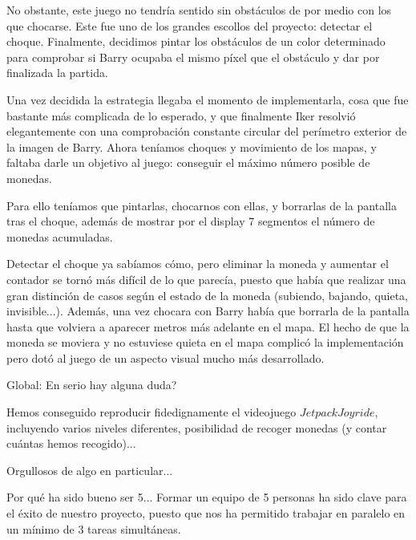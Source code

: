 \documentclass[11pt, a4paper, spanish, openright, twoside]{book}
\begin{document}
No obstante, este juego no tendría sentido sin obstáculos de por medio con los que chocarse.
Este fue uno de los grandes escollos del proyecto: detectar el choque.
Finalmente, decidimos pintar los obstáculos de un color determinado para comprobar si Barry ocupaba el mismo píxel que el obstáculo y dar por finalizada la partida.

Una vez decidida la estrategia llegaba el momento de implementarla, cosa que fue bastante más complicada de lo esperado, y que finalmente Iker resolvió elegantemente con una comprobación constante circular del perímetro exterior de la imagen de Barry.
Ahora teníamos choques y movimiento de los mapas, y faltaba darle un objetivo al juego: conseguir el máximo número posible de monedas.

Para ello teníamos que pintarlas, chocarnos con ellas, y borrarlas de la pantalla tras el choque, además de mostrar por el display 7 segmentos el número de monedas acumuladas.

Detectar el choque ya sabíamos cómo, pero eliminar la moneda y aumentar el contador se tornó más difícil de lo que parecía, puesto que había que realizar una gran distinción de casos según el estado de la moneda (subiendo, bajando, quieta, invisible...). Además, una vez chocara con Barry había que borrarla de la pantalla hasta que volviera a aparecer metros más adelante en el mapa. El hecho de que la moneda se moviera y no estuviese quieta en el mapa complicó la implementación pero dotó al juego de un aspecto visual mucho más desarrollado.

Global:
En serio hay alguna duda?

Hemos conseguido reproducir fidedignamente el videojuego $Jetpack Joyride$, incluyendo varios niveles diferentes, posibilidad de recoger monedas (y contar cuántas hemos recogido)...

Orgullosos de algo en particular...

Por qué ha sido bueno ser 5...
Formar un equipo de 5 personas ha sido clave para el éxito de nuestro proyecto, puesto que nos ha permitido trabajar en paralelo en un mínimo de 3 tareas simultáneas. 
\end{document}
